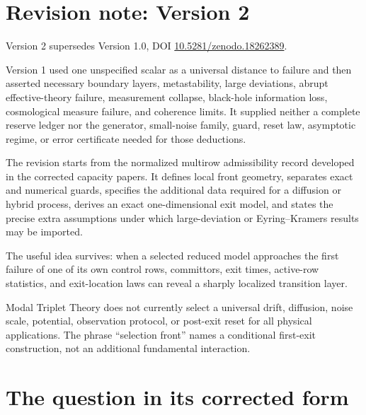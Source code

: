 \documentclass[11pt]{article}
\theoremstyle{definition}
\theoremstyle{remark}
\newcommand{\MTT}{Modal Triplet Theory}
\begin{document}
\section*{Revision note: Version 2}
\begin{description}[leftmargin=2.5cm,style=nextline]
\item[Supersedes]
Version 2 supersedes Version 1.0, DOI
\href{https://doi.org/10.5281/zenodo.18262389}
{10.5281/zenodo.18262389}.

\item[Reason]
Version 1 used one unspecified scalar as a universal distance to failure
and then asserted necessary boundary layers, metastability, large
deviations, abrupt effective-theory failure, measurement collapse,
black-hole information loss, cosmological measure failure, and coherence
limits.  It supplied neither a complete reserve ledger nor the generator,
small-noise family, guard, reset law, asymptotic regime, or error
certificate needed for those deductions.

\item[Resolution]
The revision starts from the normalized multirow admissibility record
developed in the corrected capacity papers.  It defines local front
geometry, separates exact and numerical guards, specifies the additional
data required for a diffusion or hybrid process, derives an exact
one-dimensional exit model, and states the precise extra assumptions under
which large-deviation or Eyring--Kramers results may be imported.

\item[Retained content]
The useful idea survives: when a selected reduced model approaches the
first failure of one of its own control rows, committors, exit times,
active-row statistics, and exit-location laws can reveal a sharply
localized transition layer.

\item[Remaining boundary]
\MTT{} does not currently select a universal drift, diffusion, noise
scale, potential, observation protocol, or post-exit reset for all physical
applications.  The phrase ``selection front'' names a conditional
first-exit construction, not an additional fundamental interaction.
\end{description}

\tableofcontents

\section{The question in its corrected form}
\label{sec:intro}
\end{document}
